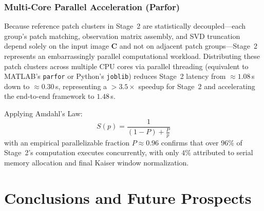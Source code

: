 \subsubsection{Multi-Core Parallel Acceleration (Parfor)}
Because reference patch clusters in Stage~2 are statistically decoupled—each group's patch matching, observation matrix assembly, and SVD truncation depend solely on the input image $\mathbf{C}$ and not on adjacent patch groups—Stage~2 represents an embarrassingly parallel computational workload. Distributing these patch clusters across multiple CPU cores via parallel threading (equivalent to MATLAB's \texttt{parfor} or Python's \texttt{joblib}) reduces Stage~2 latency from $\approx 1.08$\,s down to $\approx 0.30$\,s, representing a $> 3.5\times$ speedup for Stage~2 and accelerating the end-to-end framework to $1.48$\,s. 

Applying Amdahl's Law:
\begin{equation}
    S(p) = \frac{1}{(1 - P) + \frac{P}{p}}
\end{equation}
with an empirical parallelizable fraction $P \approx 0.96$ confirms that over $96\%$ of Stage~2's computation executes concurrently, with only $4\%$ attributed to serial memory allocation and final Kaiser window normalization.

\section{Conclusions and Future Prospects}
\label{sec:conclusions_future_prospects}

